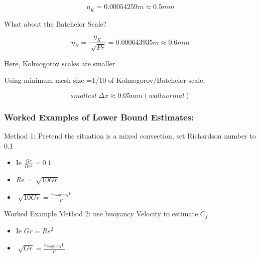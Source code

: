 \documentclass[12pt]{article}
\renewcommand{\_}{\kern-1.5pt\textunderscore\kern-1.5pt}
\begin{document}
 \[  \eta _{K}=0.00054259 m \approx 0.5 mm \] \par

What about the Batchelor Scale?\par

 \[  \eta _{B}=\frac{ \eta _{K}}{\sqrt[]{Pr}}=0.000643935 m \approx 0.6 mm \] \par

Here, Kolmogorov scales are smaller\par


\vspace{\baselineskip}
Using minimum mesh size =1/10 of Kolmogorov/Batchelor scale,\par

 \[ smallest~ \Delta x \approx 0.05 mm  \left( wall normal \right)  \] \par


\vspace{\baselineskip}
\subsubsection{Worked Examples of Lower Bound Estimates:}\par

Method 1: Pretend the situation is a mixed convection, set Richardson number to 0.1\par

\begin{itemize}
	\item Ie  \( \frac{Gr}{Re^{2}}=0.1 \) \par

	\item  \( Re=\sqrt[]{10Gr} \) \par

	\item  \( \sqrt[]{10Gr}=\frac{u_{buoyancy}L}{ \nu } \) \par


\end{itemize}
Worked Example Method 2: use buoyancy Velocity to estimate  \( C_{f} \) \par

\begin{itemize}
	\item Ie  \( Gr=Re^{2} \) \par

	\item  \( \sqrt[]{Gr}=\frac{u_{buoyancy}L}{ \nu } \) \par
\end{itemize}
\end{document}
